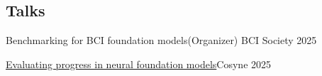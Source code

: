 \subsection*{Talks}

    \headerrow
    {Benchmarking for BCI foundation models}{(Organizer) BCI Society 2025}

    \headerrow
    {\href{https://www.youtube.com/watch?v=niSFDWHijoE}{Evaluating progress in neural foundation models}}{Cosyne 2025}
